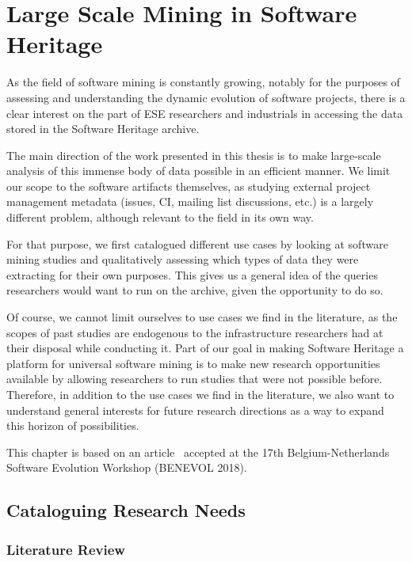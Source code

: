 \chapter{Large Scale Mining in Software Heritage}

As the field of software mining is constantly growing, notably for the purposes
of assessing and understanding the dynamic evolution of software projects,
there is a clear interest on the part of \gls{ESE} researchers and industrials
in accessing the data stored in the Software Heritage archive.

The main direction of the work presented in this thesis is to make large-scale
analysis of this immense body of data possible in an efficient manner. We limit
our scope to the software artifacts themselves, as studying external project
management metadata (issues, \acrshort{CI}, mailing list discussions, etc.) is
a largely different problem, although relevant to the field in its own way.

For that purpose, we first catalogued different use cases by looking at
software mining studies and qualitatively assessing which types of data they
were extracting for their own purposes. This gives us a general idea of the
queries researchers would want to run on the archive, given the opportunity to
do so.

Of course, we cannot limit ourselves to use cases we find in the literature,
as the scopes of past studies are endogenous to the infrastructure researchers
had at their disposal while conducting it. Part of our goal in making Software
Heritage a platform for universal software mining is to make new research
opportunities available by allowing researchers to run studies that were not
possible before. Therefore, in addition to the use cases we find in the
literature, we also want to understand general interests for future research
directions as a way to expand this horizon of possibilities.

\vspace{0.5cm}

This chapter is based on an article~\cite{swh-benevol2018-universal-analysis}
accepted at the 17th Belgium-Netherlands Software Evolution Workshop (BENEVOL
2018).

\section{Cataloguing Research Needs}

\subsection{Literature Review}

